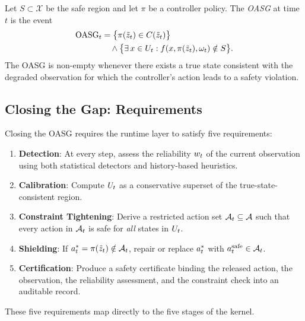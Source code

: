 \begin{definition}\label{def:oasg}
Let $S \subset \mathcal{X}$ be the safe region and let $\pi$ be a controller policy.
The \emph{OASG} at time $t$ is the event
\begin{equation}\label{eq:oasg}
  \begin{aligned}
  \mathrm{OASG}_t
    &= \bigl\{\pi(\tilde{z}_t) \in C(\tilde{z}_t)\bigr\} \\
    &\quad{}\wedge
       \bigl\{\exists\, x \in U_t :
       f(x,\pi(\tilde{z}_t),\omega_t) \notin S\bigr\}.
  \end{aligned}
\end{equation}
The OASG is non-empty whenever there exists a true state consistent with the
degraded observation for which the controller's action leads to a safety violation.
\end{definition}

\subsection{Closing the Gap: Requirements}

Closing the OASG requires the runtime layer to satisfy five requirements:

\begin{enumerate}[label=\textbf{R\arabic*},nosep]
  \item \textbf{Detection}: At every step, assess the reliability $w_t$ of the
        current observation using both statistical detectors and history-based
        heuristics.
  \item \textbf{Calibration}: Compute $U_t$ as a conservative superset of the
        true-state-consistent region.
  \item \textbf{Constraint Tightening}: Derive a restricted action set
        $\mathcal{A}_t \subseteq \mathcal{A}$ such that every action in $\mathcal{A}_t$ is safe
        for \emph{all} states in $U_t$.
  \item \textbf{Shielding}: If $a_t^{*} = \pi(\tilde{z}_t) \notin \mathcal{A}_t$, repair or
        replace $a_t^{*}$ with $a_t^{\mathrm{safe}} \in \mathcal{A}_t$.
  \item \textbf{Certification}: Produce a safety certificate binding the released
        action, the observation, the reliability assessment, and the constraint check
        into an auditable record.
\end{enumerate}

These five requirements map directly to the five stages of the \dcs{} kernel.

